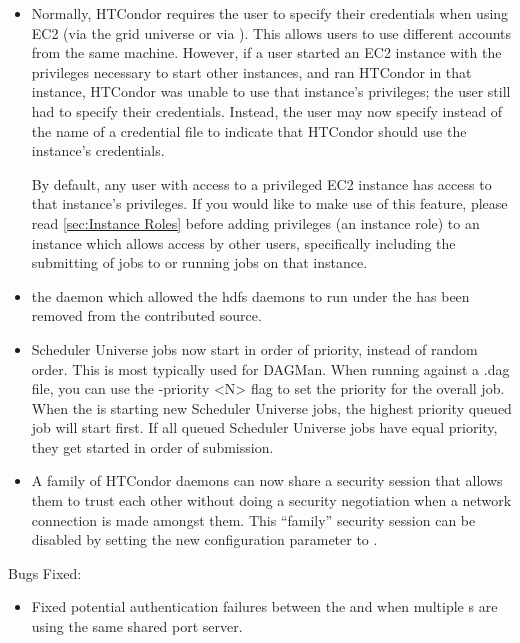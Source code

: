\begin{itemize}

\item  Normally, HTCondor requires the user to specify their credentials
when using EC2 (via the grid universe or via ).  This allows
users to use different accounts from the same machine.  However,
if a user started an EC2 instance with the privileges necessary to start
other instances, and ran HTCondor in that instance, HTCondor was unable to
use that instance's privileges; the user still had to specify their
credentials.  Instead, the user may now specify  instead
of the name of a credential file to indicate that HTCondor should use the
instance's credentials.

By default, any user with access to a privileged EC2 instance has access to
that instance's privileges.  If you would like to make use of this feature,
please read \ref{sec:Instance Roles} before adding privileges (an instance
role) to an instance which allows access by other users, specifically
including the submitting of jobs to or running jobs on that instance.

\item the  daemon which allowed the hdfs daemons to run under
the  has been removed from the contributed source. 

\item Scheduler Universe jobs now start in order of priority, instead of random 
order. This is most typically used for DAGMan. When running 
against a .dag file, you can use the -priority <N> flag to set the priority
for the overall  job. When the  is starting new 
Scheduler Universe jobs, the highest priority queued job will start first. If 
all queued Scheduler Universe jobs have equal priority, they get started in 
order of submission.

\item A family of HTCondor daemons can now share a security session that
allows them to trust each other without doing a security negotiation
when a network connection is made amongst them.
This ``family'' security session can be disabled by setting the new
configuration parameter  to .

\end{itemize}

\noindent Bugs Fixed:

\begin{itemize}

\item Fixed potential authentication failures between the 
and  when multiple s are using the same
shared port server.

\end{itemize}

